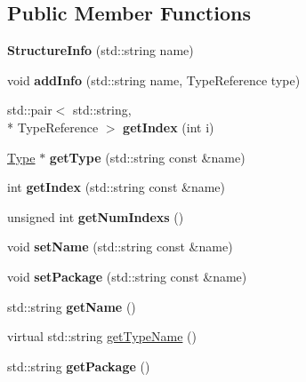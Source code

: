 \subsection*{Public Member Functions}
\begin{DoxyCompactItemize}
\item 
\hypertarget{class_structure_info_a9ba599f5e15f8643cf9a6a1d80afc43b}{{\bfseries Structure\-Info} (std\-::string name)}\label{class_structure_info_a9ba599f5e15f8643cf9a6a1d80afc43b}

\item 
\hypertarget{class_structure_info_a92fd17c506f46d3a80709dd430af3ed6}{void {\bfseries add\-Info} (std\-::string name, Type\-Reference type)}\label{class_structure_info_a92fd17c506f46d3a80709dd430af3ed6}

\item 
\hypertarget{class_structure_info_a033ce236e8c6ec33527ab8a2e19c74f5}{std\-::pair$<$ std\-::string, \\*
Type\-Reference $>$ {\bfseries get\-Index} (int i)}\label{class_structure_info_a033ce236e8c6ec33527ab8a2e19c74f5}

\item 
\hypertarget{class_structure_info_a00ccb8cd6103eb128c0fa4b3f996eb88}{\hyperlink{class_type}{Type} $\ast$ {\bfseries get\-Type} (std\-::string const \&name)}\label{class_structure_info_a00ccb8cd6103eb128c0fa4b3f996eb88}

\item 
\hypertarget{class_structure_info_aedd1fd6cec156f32833dd618792b8f1c}{int {\bfseries get\-Index} (std\-::string const \&name)}\label{class_structure_info_aedd1fd6cec156f32833dd618792b8f1c}

\item 
\hypertarget{class_structure_info_a096b2f6d3b1c7de639dd457301317753}{unsigned int {\bfseries get\-Num\-Indexs} ()}\label{class_structure_info_a096b2f6d3b1c7de639dd457301317753}

\item 
\hypertarget{class_structure_info_a4a1570cf494d9ce1a269ea1a2662072b}{void {\bfseries set\-Name} (std\-::string const \&name)}\label{class_structure_info_a4a1570cf494d9ce1a269ea1a2662072b}

\item 
\hypertarget{class_structure_info_a78d5a202d847d058c0a4e9b2bf38392b}{void {\bfseries set\-Package} (std\-::string const \&name)}\label{class_structure_info_a78d5a202d847d058c0a4e9b2bf38392b}

\item 
\hypertarget{class_structure_info_a9af6a98eac83856eb70c7d95ca4a898e}{std\-::string {\bfseries get\-Name} ()}\label{class_structure_info_a9af6a98eac83856eb70c7d95ca4a898e}

\item 
virtual std\-::string \hyperlink{class_structure_info_acf086fd3eed118dd6d86782630cc93f2}{get\-Type\-Name} ()
\item 
\hypertarget{class_structure_info_ad2a6369531cd49a495439715300a1c9b}{std\-::string {\bfseries get\-Package} ()}\label{class_structure_info_ad2a6369531cd49a495439715300a1c9b}

\end{DoxyCompactItemize}


